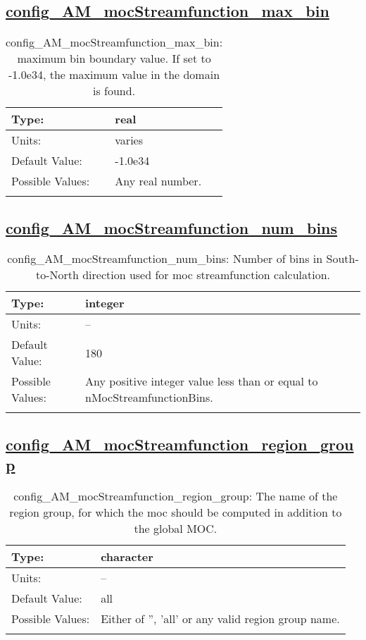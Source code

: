 \subsection[config\_AM\_mocStreamfunction\_max\_bin]{\hyperref[sec:nm_tab_AM_mocStreamfunction]{config\_AM\_mocStreamfunction\_max\_bin}}
\label{subsec:nm_sec_config_AM_mocStreamfunction_max_bin}
\begin{center}
\begin{longtable}{| p{2.0in} || p{4.0in} |}
    \hline
    Type: & real \\
    \hline
    Units: & \si{varies} \\
    \hline
    Default Value: & -1.0e34 \\
    \hline
    Possible Values: & Any real number. \\
    \hline
    \caption{config\_AM\_mocStreamfunction\_max\_bin: maximum bin boundary value.  If set to -1.0e34, the maximum value in the domain is found.}
\end{longtable}
\end{center}
\subsection[config\_AM\_mocStreamfunction\_num\_bins]{\hyperref[sec:nm_tab_AM_mocStreamfunction]{config\_AM\_mocStreamfunction\_num\_bins}}
\label{subsec:nm_sec_config_AM_mocStreamfunction_num_bins}
\begin{center}
\begin{longtable}{| p{2.0in} || p{4.0in} |}
    \hline
    Type: & integer \\
    \hline
    Units: & -- \\
    \hline
    Default Value: & 180 \\
    \hline
    Possible Values: & Any positive integer value less than or equal to nMocStreamfunctionBins. \\
    \hline
    \caption{config\_AM\_mocStreamfunction\_num\_bins: Number of bins in South-to-North direction used for moc streamfunction calculation.}
\end{longtable}
\end{center}
\subsection[config\_AM\_mocStreamfunction\_region\_group]{\hyperref[sec:nm_tab_AM_mocStreamfunction]{config\_AM\_mocStreamfunction\_region\_group}}
\label{subsec:nm_sec_config_AM_mocStreamfunction_region_group}
\begin{center}
\begin{longtable}{| p{2.0in} || p{4.0in} |}
    \hline
    Type: & character \\
    \hline
    Units: & -- \\
    \hline
    Default Value: & all \\
    \hline
    Possible Values: & Either of '', 'all' or any valid region group name. \\
    \hline
    \caption{config\_AM\_mocStreamfunction\_region\_group: The name of the region group, for which the moc should be computed in addition to the global MOC.}
\end{longtable}
\end{center}
